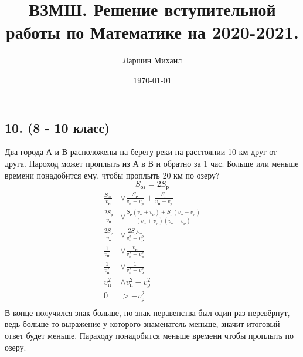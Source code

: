 \documentclass[a4paper,12pt]{article} %
\title{ВЗМШ. Решение вступительной работы по Математике на 2020-2021.}
\author{Ларшин Михаил}
\date{\today}
\begin{document}
	
	\maketitle
	\newpage
	
	\subsection*{10. (8 - 10 класс)}{Два города А и В расположены на берегу реки на расстоянии 10 км друг от друга. Пароход может проплыть из А в В и обратно за 1 час. Больше или меньше времени понадобится ему, чтобы проплыть 20 км по озеру?\\
		
		$$S_{оз} = 2S_р$$
		\begin{align*}
			\frac{S_{oз}}{v_п} &\vee \frac{S_р}{v_п + v_р} + \frac{S_р}{v_п - v_р}\\
			\frac{2S_р}{v_п} &\vee \frac{S_р(v_п + v_р)+S_р(v_п - v_р)}{(v_п + v_р)(v_п - v_р)}\\
			\frac{2S_р}{v_п} &\vee \frac{2S_рv_п}{v_п^2 - v_р^2}\\
			\frac{1}{v_п} &\vee \frac{v_п}{v_п^2 - v_р^2}\\
			\frac{1}{v_п^2} &\vee \frac{1}{v_п^2 - v_р^2}\\
			v_п^2 &\wedge v_п^2 - v_р^2\\
			0 &> - v_р^2\\
		\end{align*}
		В конце получился знак больше, но знак неравенства был один раз перевёрнут, ведь больше то выражение у которого знаменатель меньше, значит итоговый ответ будет меньше. Параходу понадобится меньше времени чтобы проплыть по озеру.
	}
	
\end{document}
